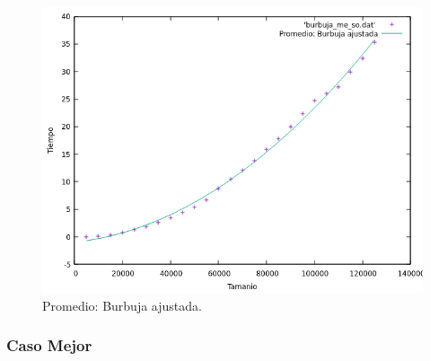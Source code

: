 \documentclass[a4paper,12pt,twoside]{article} %
\begin{document}
\begin{itemize}
\begin{figure}[h]
\begin{center}
  	\includegraphics[scale=0.8]{burbuja_me_so_a.png}
  	\caption{Promedio: Burbuja ajustada.}
  	
  \end{center}
\end{figure}
		
		
		
		\end{itemize}
\newpage
	
	\subsubsection{Caso Mejor}
	
\end{document}

